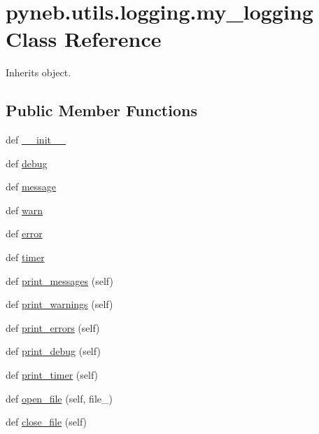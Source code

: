 \hypertarget{classpyneb_1_1utils_1_1logging_1_1my__logging}{}\section{pyneb.\+utils.\+logging.\+my\+\_\+logging Class Reference}
\label{classpyneb_1_1utils_1_1logging_1_1my__logging}


Inherits object.

\subsection*{Public Member Functions}
\begin{DoxyCompactItemize}
\item 
def \hyperlink{classpyneb_1_1utils_1_1logging_1_1my__logging_a0cc4a77d6e98d36c9534d366349d1f66}{\+\_\+\+\_\+init\+\_\+\+\_\+}
\item 
def \hyperlink{classpyneb_1_1utils_1_1logging_1_1my__logging_ab2479af710eb9d4326680ecd1e1ebdc3}{debug}
\item 
def \hyperlink{classpyneb_1_1utils_1_1logging_1_1my__logging_aa68e779cfc1c812574fb4ddf65041965}{message}
\item 
def \hyperlink{classpyneb_1_1utils_1_1logging_1_1my__logging_aed7bf24f37fee46da46caae857bc383c}{warn}
\item 
def \hyperlink{classpyneb_1_1utils_1_1logging_1_1my__logging_a8d71fe419d7ac8f28ad780518665294b}{error}
\item 
def \hyperlink{classpyneb_1_1utils_1_1logging_1_1my__logging_add0fcb8b9321526315dbf724c9b09064}{timer}
\item 
def \hyperlink{classpyneb_1_1utils_1_1logging_1_1my__logging_aa982aaf0aa003e1d477bcf822e12282d}{print\+\_\+messages} (self)
\item 
def \hyperlink{classpyneb_1_1utils_1_1logging_1_1my__logging_a7791971e98a02aadfb07d77b82db9ec0}{print\+\_\+warnings} (self)
\item 
def \hyperlink{classpyneb_1_1utils_1_1logging_1_1my__logging_ac1cd88d7fcf4dd4cc3937af8f6423347}{print\+\_\+errors} (self)
\item 
def \hyperlink{classpyneb_1_1utils_1_1logging_1_1my__logging_a54778e07a6434deeb86818cd2425f2e0}{print\+\_\+debug} (self)
\item 
def \hyperlink{classpyneb_1_1utils_1_1logging_1_1my__logging_ad5cf5feb048b230e8aa66175286f1e27}{print\+\_\+timer} (self)
\item 
def \hyperlink{classpyneb_1_1utils_1_1logging_1_1my__logging_ac9d91e4353c37841efe4088f61944670}{open\+\_\+file} (self, file\+\_\+)
\item 
def \hyperlink{classpyneb_1_1utils_1_1logging_1_1my__logging_ab50465dd0e147312b5e1392442d9508d}{close\+\_\+file} (self)
\end{DoxyCompactItemize}
